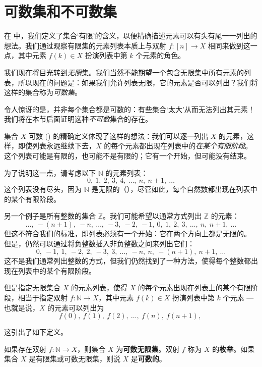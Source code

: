\section{可数集和不可数集}

在  中，我们定义了集合`有限'的含义，以便精确描述元素可以有头有尾一一列出的想法。我们通过观察有限集的元素列表本质上与双射 $f : [n] \to X$ 相同来做到这一点，其中元素 $f(k) \in X$ 扮演列表中第 $k$ 个元素的角色。

我们现在将目光转到\textit{无限}集。我们当然不能期望一个包含无限集中所有元素的列表，所以现在的问题是：如果我们允许列表无限，它的元素是否可以列出？我们将这样的集合称为\textit{可数集}。

令人惊讶的是，并非每个集合都是可数的：有些集合`太大'从而无法列出其元素！我们将在本节后面证明这种\textit{不可数}集合的存在。

集合 $X$ 可数 () 的精确定义体现了这样的想法：我们可以逐一列出 $X$ 的元素，这样，即使列表永远继续下去，$X$ 的每个元素都出现在列表中的\textit{在某个有限阶段}。这个列表可能是有限的，也可能不是有限的；它有一个开始，但可能没有结束。

为了说明这一点，请考虑以下 $\mathbb{N}$ 的元素列表：
\[ 0,~ 1,~ 2,~ 3,~ 4,~ \dots,~ n,~ n+1,~ \dots \]
这个列表没有尽头，因为 $\mathbb{N}$ 是无限的（），尽管如此，每个自然数都出现在列表中的某个有限阶段。

另一个例子是所有整数的集合 $\mathbb{Z}$。我们可能希望以通常方式列出 $\mathbb{Z}$ 的元素：
\[ \dots,~ -(n+1),~ -n,~ \dots,~ -3,~ -2,~ -1,~ 0,~ 1,~ 2,~ 3,~ \dots,~ n,~ n+1,~ \dots \]
但这不符合我们的标准，即列表必须有一个开始：它在两个方向上都是无限的。
但是，仍然可以通过将负整数插入非负整数之间来列出它们：
\[ 0,~ -1,~ 1,~ -2,~ 2,~ -3,~ 3,~ \dots,~ -n,~ n,~ -(n+1),~ n+1,~ \dots\]
这不是我们通常列出整数的方式，但我们仍然找到了一种方法，使得每个整数都出现在列表中的某个有限阶段。

但是指定无限集合 $X$ 的元素列表，使得 $X$ 的每个元素出现在列表上的某个有限阶段，相当于指定双射 $f : \mathbb{N} \to X$，其中元素 $f(k) \in X$ 扮演列表中第 $k$ 个元素 --- 也就是说，$X$ 的元素可以列出为
\[  f(0),~ f(1),~ f(2),~ \dots,~ f(n),~ f(n+1),~ \]

这引出了如下定义。

\begin{definition}
\label{defCountable}
如果存在双射 $f : \mathbb{N} \to X$，则集合 $X$ 为\textbf{可数无限集}。双射 $f$ 称为 $X$ 的\textbf{枚举}。如果集合 $X$ 是有限集或可数无限集，则说 $X$ 是\textbf{可数的}。
\end{definition}

